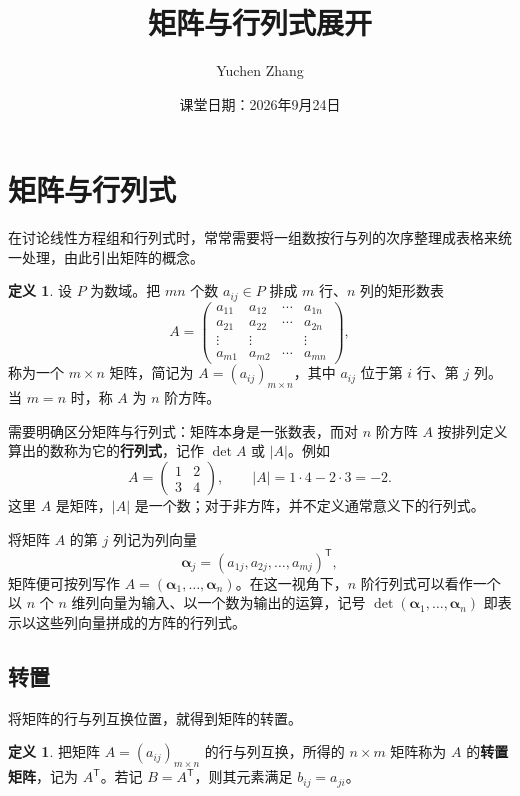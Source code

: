 \documentclass[UTF8, fontset=fandol, a4paper, 12pt]{ctexart}
\title{矩阵与行列式展开}
\author{Yuchen Zhang}
\date{课堂日期：2026年9月24日}
\makeatletter
\theoremstyle{definition}
\newtheorem{definition}[theorem]{定义}
\renewcommand{\maketitle}{%
  \begin{center}
    {\LARGE\bfseries \@title\par}\vspace{0.6em}
    \@author\par\vspace{0.2em}
    {\small \@date\par}
  \end{center}
}
\makeatother
\begin{document}
\maketitle

\section{矩阵与行列式}

在讨论线性方程组和行列式时，常常需要将一组数按行与列的次序整理成表格来统一处理，由此引出矩阵的概念。

\begin{definition}
设 $P$ 为数域。把 $mn$ 个数 $a_{ij}\in P$ 排成 $m$ 行、$n$ 列的矩形数表
\[
 A=\begin{pmatrix}
 a_{11}&a_{12}&\cdots&a_{1n}\\
 a_{21}&a_{22}&\cdots&a_{2n}\\
 \vdots&\vdots&&\vdots\\
 a_{m1}&a_{m2}&\cdots&a_{mn}
 \end{pmatrix},
\]
称为一个 $m\times n$ 矩阵，简记为 $A=(a_{ij})_{m\times n}$，其中 $a_{ij}$ 位于第 $i$ 行、第 $j$ 列。当 $m=n$ 时，称 $A$ 为 $n$ 阶方阵。
\end{definition}

需要明确区分矩阵与行列式：矩阵本身是一张数表，而对 $n$ 阶方阵 $A$ 按排列定义算出的数称为它的\textbf{行列式}，记作 $\det A$ 或 $|A|$。例如
\[
 A=\begin{pmatrix}1&2\\3&4\end{pmatrix},
 \qquad |A|=1\cdot4-2\cdot3=-2.
\]
这里 $A$ 是矩阵，$|A|$ 是一个数；对于非方阵，并不定义通常意义下的行列式。

将矩阵 $A$ 的第 $j$ 列记为列向量
\[
 \boldsymbol\alpha_j=(a_{1j},a_{2j},\ldots,a_{mj})^{\mathsf T},
\]
矩阵便可按列写作 $A=(\boldsymbol\alpha_1,\ldots,\boldsymbol\alpha_n)$。在这一视角下，$n$ 阶行列式可以看作一个以 $n$ 个 $n$ 维列向量为输入、以一个数为输出的运算，记号 $\det(\boldsymbol\alpha_1,\ldots,\boldsymbol\alpha_n)$ 即表示以这些列向量拼成的方阵的行列式。

\subsection{转置}

将矩阵的行与列互换位置，就得到矩阵的转置。

\begin{definition}
把矩阵 $A=(a_{ij})_{m\times n}$ 的行与列互换，所得的 $n\times m$ 矩阵称为 $A$ 的\textbf{转置矩阵}，记为 $A^{\mathsf T}$。若记 $B=A^{\mathsf T}$，则其元素满足 $b_{ij}=a_{ji}$。
\end{definition}
\end{document}
